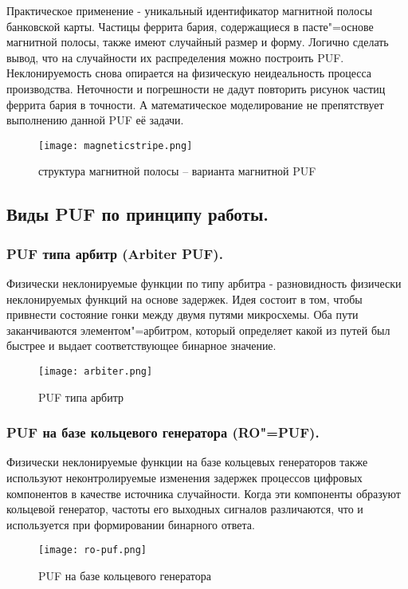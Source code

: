 Практическое применение - уникальный идентификатор магнитной полосы банковской карты. Частицы феррита бария, содержащиеся в пасте"=основе магнитной полосы, также имеют случайный размер и форму. Логично сделать вывод, что на случайности их распределения можно построить PUF. Неклонируемость снова опирается на физическую неидеальность процесса производства. Неточности и погрешности не дадут повторить рисунок частиц феррита бария в  точности. А математическое моделирование не препятствует выполнению данной PUF её задачи.
\begin{figure}[ht]
    \centering
    \label{fig:domain:puf_physical_types:magnetic}
    \texttt{[image: magneticstripe.png]}
    \caption{структура магнитной полосы -- варианта магнитной PUF}
\end{figure}

\subsection{Виды PUF по принципу работы. }
\label{sub:domain:puf_types}


\subsubsection{PUF типа арбитр (Arbiter PUF). }
\label{sub:domain:puf_types:arbiter}

Физически неклонируемые функции по типу арбитра - разновидность физически неклонируемых функций на основе задержек. Идея состоит в том, чтобы привнести состояние гонки между двумя путями микросхемы. Оба пути заканчиваются элементом"=арбитром, который определяет какой из путей был быстрее и выдает соответствующее бинарное значение.
\begin{figure}[ht]
    \centering
    \label{fig:domain:puf_types:arbiter}
    \texttt{[image: arbiter.png]}
    \caption{PUF типа арбитр}
\end{figure}

\subsubsection{PUF на базе кольцевого генератора (RO"=PUF). }
\label{sub:domain:puf_types:ring_oscillator}

Физически неклонируемые функции на базе кольцевых генераторов также используют неконтролируемые изменения задержек процессов цифровых компонентов в качестве источника случайности. Когда эти компоненты образуют кольцевой генератор, частоты его выходных сигналов различаются, что и используется при формировании бинарного ответа.
\begin{figure}[ht]
    \centering
    \label{fig:domain:puf_types:ring_oscillator}
    \texttt{[image: ro-puf.png]}
    \caption{PUF на базе кольцевого генератора}
\end{figure}


